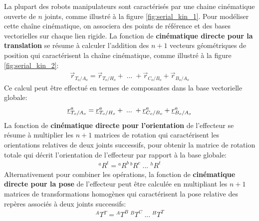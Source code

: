 La plupart des robots manipulateurs sont caractérisés par une chaine cinématique ouverte de $n$ joints, comme illustré à la figure \ref{fig:serial_kin_1}. Pour modéliser cette chaîne cinématique, on associera des points de référence et des bases vectorielles sur chaque lien rigide. La fonction de \textbf{cinématique directe pour la translation} se résume à calculer l'addition des $n+1$ vecteurs géométriques de position qui caractérisent la chaîne cinématique, comme illustré à la figure \ref{fig:serial_kin_2}:
\begin{align}
\vec{r}_{T_o/A_o} = \vec{r}_{T_o/H_o} + \; ... \; + \vec{r}_{C_o/B_o} + \vec{r}_{B_o/A_o}
\label{eq:fwdkintransvec}
\end{align} 
Ce calcul peut être effectué en termes de composantes dans la base vectorielle globale:
\begin{align}
\underline{r}_{T_o/A_o}^a = \underline{r}_{T_o/H_o}^a + \; ... \; + \underline{r}_{C_o/B_o}^a + \underline{r}_{B_o/A_o}^a
\label{eq:fwdkintrans}
\end{align} 
La fonction de \textbf{cinématique directe pour l'orientation} de l'effecteur se résume à multiplier les $n+1$ matrices de rotation qui caractérisent les orientations relatives de deux joints successifs, pour obtenir la matrice de rotation totale qui décrit l'orientation de l'effecteur par rapport à la base globale:
\begin{align}
{}^aR^t = {}^aR^b \,  {}^bR^c \; ... \; {}^hR^t
\label{eq:fwdkinorien}
\end{align} 
Alternativement pour combiner les opérations, la fonction de \textbf{cinématique directe pour la pose} de l'effecteur peut être calculée en multipliant les $n+1$ matrices de transformations homogènes qui caractérisent la pose relative des repères associés à deux joints successifs:
\begin{align}
{}^AT{}^T = {}^AT^B \;  {}^BT^C \; ... \; {}^HT^T
\label{eq:fwdkinhomo}
\end{align} 




